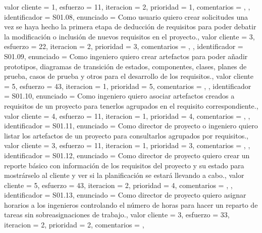 \documentclass[a4paper, 12pt, spanish]{memoria}
\begin{document}
{{    valor cliente = 1,
    esfuerzo      = {1}{1},
    iteracion     = 2,
    prioridad     = 1,
    comentarios   = {},
},{%
    identificador = S01.08,
    enunciado     = {Como usuario quiero crear solicitudes una vez se haya hecho la primera etapa de deducción de requisitos para poder debatir la modificación o inclusión de nuevos requisitos en el proyecto.},
    valor cliente = 3,
    esfuerzo      = {2}{2},
    iteracion     = 2,
    prioridad     = 3,
    comentarios   = {},
},{%
    identificador = S01.09,
    enunciado     = {Como ingeniero quiero crear artefactos para poder añadir prototipos, diagramas de transición de estados, componentes, clases, planes de prueba, casos de prueba y otros para el desarrollo de los requisitos.},
    valor cliente = 5,
    esfuerzo      = {4}{3},
    iteracion     = 1,
    prioridad     = 5,
    comentarios   = {},
},{%
    identificador = S01.10,
    enunciado     = {Como ingeniero quiero asociar artefactos creados a requisitos de un proyecto para tenerlos agrupados en el requisito correspondiente.},
    valor cliente = 4,
    esfuerzo      = {1}{1},
    iteracion     = 1,
    prioridad     = 4,
    comentarios   = {},
},{%
    identificador = S01.11,
    enunciado     = {Como director de proyecto o ingeniero quiero listar los artefactos de un proyecto para consultarlos agrupados por requisitos.},
    valor cliente = 3,
    esfuerzo      = {1}{1},
    iteracion     = 1,
    prioridad     = 3,
    comentarios   = {},
},{%
    identificador = S01.12,
    enunciado     = {Como director de proyecto quiero crear un reporte básico con información de los requisitos del proyecto y su estado para mostrárselo al cliente y ver si la planificación se estará llevando a cabo.},
    valor cliente = 5,
    esfuerzo      = {4}{3},
    iteracion     = 2,
    prioridad     = 4,
    comentarios   = {},
},{%
    identificador = S01.13,
    enunciado     = {Como director de proyecto quiero asignar horarios a los ingenieros controlando el número de horas para hacer un reparto de tareas sin sobreasignaciones de trabajo.},
    valor cliente = 3,
    esfuerzo      = {3}{3},
    iteracion     = 2,
    prioridad     = 2,
    comentarios   = {},
}} %

\end{document}
